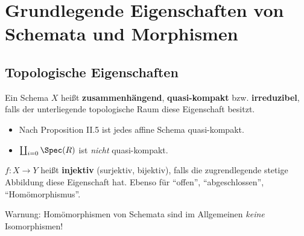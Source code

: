 \chapter*{Grundlegende Eigenschaften von Schemata und Morphismen}

\section{Topologische Eigenschaften }
\begin{defn}[12]
  Ein Schema $X$ heißt \textbf{zusammenhängend}, \textbf{quasi-kompakt}
  bzw. \textbf{irreduzibel}, falls der unterliegende topologische Raum
  diese Eigenschaft besitzt.
\end{defn}

\begin{itemize}
\item Nach Proposition II.5 ist jedes affine Schema quasi-kompakt.
\item $\coprod_{i=0}\Spec(R)$ ist \emph{nicht }quasi-kompakt.
\end{itemize}
\begin{defn}[13]
  $f:X\rightarrow Y$ heißt \textbf{injektiv} (surjektiv, bijektiv),
  falls die zugrendlegende stetige Abbildung diese Eigenschaft hat.
  Ebenso für ``offen'', ``abgeschlossen'', ``Homömorphismus''.
\end{defn}

Warnung: Homömorphismen von Schemata sind im Allgemeinen \emph{keine
}Isomorphismen!
